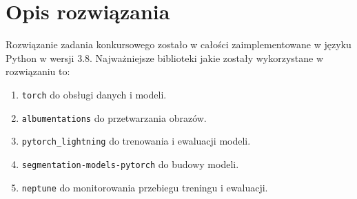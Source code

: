 \newpage %
\section{Opis rozwiązania}
Rozwiązanie zadania konkursowego zostało w całości zaimplementowane w języku Python w wersji 3.8. Najważniejsze biblioteki jakie zostały wykorzystane w rozwiązaniu to:
\begin{enumerate}
\item \texttt{torch} do obsługi danych i modeli.
\item \texttt{albumentations} do przetwarzania obrazów.
\item \texttt{pytorch\_lightning} do trenowania i ewaluacji modeli.
\item \texttt{segmentation-models-pytorch} do budowy modeli.
\item \texttt{neptune} do monitorowania przebiegu treningu i ewaluacji.
\end{enumerate}
